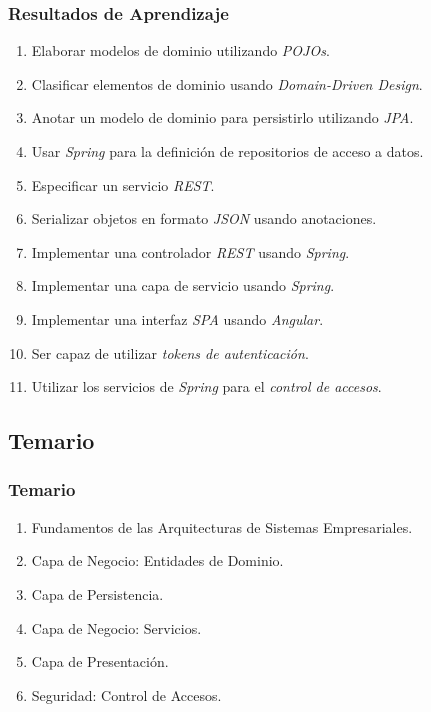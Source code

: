 \documentclass[handout,a4paper,t,xcolor=pst,colortheme]{beamer}
\begin{document}
\begin{frame}[c]
   \frametitle{Resultados de Aprendizaje}
   \begin{enumerate}[<+->]
        \item Elaborar modelos de dominio utilizando \emph{POJOs}.
        \item Clasificar elementos de dominio usando \emph{Domain-Driven Design}.
        \item Anotar un modelo de dominio para persistirlo utilizando \emph{JPA}.
        \item Usar \emph{Spring} para la definición de repositorios de acceso a datos.
        \item Especificar un servicio \emph{REST}.
        \item Serializar objetos en formato \emph{JSON} usando anotaciones.
        \item Implementar una controlador \emph{REST} usando \emph{Spring}.
        \item Implementar una capa de servicio usando \emph{Spring}.
        \item Implementar una interfaz \emph{SPA} usando \emph{Angular}.
        \item Ser capaz de utilizar \emph{tokens de autenticación}.
        \item Utilizar los servicios de \emph{Spring} para el \emph{control de accesos}.
	\end{enumerate}
\end{frame}

\subsection{Temario}

\begin{frame}[c]
	\frametitle{Temario}
	\begin{enumerate}
		\item<1-> Fundamentos de las Arquitecturas de Sistemas Empresariales.
		\item<2-> Capa de Negocio: Entidades de Dominio.
		\item<3-> Capa de Persistencia.
		\item<4-> Capa de Negocio: Servicios.
		\item<5-> Capa de Presentación.
        \item<6-> Seguridad: Control de Accesos.
	\end{enumerate}
\end{frame}
\end{document}
